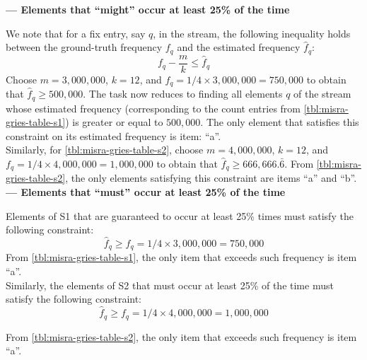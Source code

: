 \documentclass{article}
\begin{document}
\begin{enumerate}[leftmargin={*}, font={\bf}, label={\arabic*.}, ref={\arabic*}]
\begin{enumerate}[label={(\Alph*)}, ref={\theenumi(\Alph*)}]
        {\bf\sffamily --- Elements that ``might'' occur at least 25\% of the time} \par

        We note that for a fix entry, say $q$, in the stream, the following
        inequality holds between the ground-truth frequency $f_q$ and the
        estimated frequency $\hat{f}_q$:
        \[
          f_q - \frac{m}{k} \leq \hat{f}_q
        \]
        Choose $m=3,000,000$, $k=12$, and $f_q = 1/4 \times 3,000,000 = 750,000$
        to obtain that $\hat{f}_q \geq 500,000$. The task now reduces to finding
        all elements $q$ of the stream whose estimated frequency (corresponding
        to the count entries from \autoref{tbl:misra-gries-table-s1}) is greater
        or equal to $500,000$. The only element that satisfies this constraint
        on its estimated frequency is item: {\sf ``a''}. \\

        Similarly, for \autoref{tbl:misra-gries-table-s2}, choose $m=4,000,000$,
        $k=12$, and $f_q = 1/4 \times 4,000,000 = 1,000,000$ to obtain that
        $\hat{f}_q \geq 666,666.\bar{6}$. From \autoref{tbl:misra-gries-table-s2},
        the only elements satisfying this constraint are items {\sf ``a''} and
        {\sf ``b''}. \\

        {\bf\sffamily --- Elements that ``must'' occur at least 25\% of the time} \par
        
        Elements of {\sf S1} that are guaranteed to occur at least 25\% times must
        satisfy the following constraint:
        \[
          \hat{f}_q \geq f_q = 1/4 \times 3,000,000 = 750,000
        \]
        From \autoref{tbl:misra-gries-table-s1}, the only item that exceeds such
        frequency is item {\sf ``a''}. \\
        
        Similarly, the elements of {\sf S2} that must occur at least 25\% of the
        time must satisfy the following constraint:
        \[
          \hat{f}_q \geq f_q = 1/4 \times 4,000,000 = 1,000,000
        \]

        From \autoref{tbl:misra-gries-table-s2}, the only item that exceeds such
        frequency is item {\sf ``a''}.


\end{enumerate}
\end{enumerate}
\end{document}
